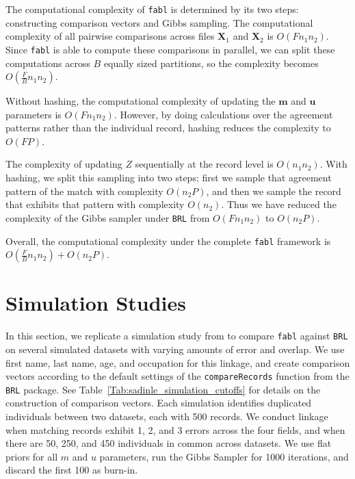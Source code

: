 \documentclass[12pt,letterpaper]{article}
\newcommand{\1}[1]{\mathbb{I}\!\left[#1\right]} %
\begin{document}
{
\color{blue}
The computational complexity of \texttt{fabl} is determined by its two steps: constructing comparison vectors and Gibbs sampling. The computational complexity of all pairwise comparisons across files $\mathbf{X}_1$ and $\mathbf{X}_2$ is $O(F n_1 n_2)$. Since \texttt{fabl} is able to compute these comparisons in parallel, we can split these computations across $B$ equally sized partitions, so the complexity becomes $O(\frac{F}{B} n_1 n_2)$.

Without hashing, the computational complexity of updating the $\mathbf{m}$ and $\mathbf{u}$ parameters is $O(F n_1 n_2)$. However, by doing calculations over the agreement patterns rather than the individual record, hashing reduces the complexity to $O(FP)$.

The complexity of updating $Z$ sequentially at the record level is $O(n_1 n_2)$. With hashing, we split this sampling into two steps; first we sample that agreement pattern of the match with complexity $O(n_2 P)$, and then we sample the record that exhibits that pattern with complexity $O(n_2)$. Thus we have reduced the complexity of the Gibbs sampler under \texttt{BRL} from $O(F n_1 n_2)$ to $O(n_2 P)$.

Overall, the computational complexity under the complete \texttt{fabl} framework is $O(\frac{F}{B} n_1 n_2) + O(n_2 P)$.
}

\section{Simulation Studies}
\label{sec:simulations}

In this section, we replicate a simulation study from \cite{sadinle_bayesian_2017} to compare \texttt{fabl} against \texttt{BRL} on several simulated datasets with varying amounts of error and overlap. We use first name, last name, age, and occupation for this linkage, and create comparison vectors according to the default settings of the \texttt{compareRecords} function from the \texttt{BRL} package. See Table~\ref{Tab:sadinle_simulation_cutoffs} for details on the construction of comparison vectors. Each simulation identifies duplicated individuals between two datasets, each with 500 records. We conduct linkage when matching records exhibit 1, 2, and 3 errors across the four fields, and when there are 50, 250, and 450 individuals in common across datasets. We use flat priors for all $m$ and $u$ parameters, run the Gibbs Sampler for 1000 iterations, and discard the first 100 as burn-in.
\end{document}
